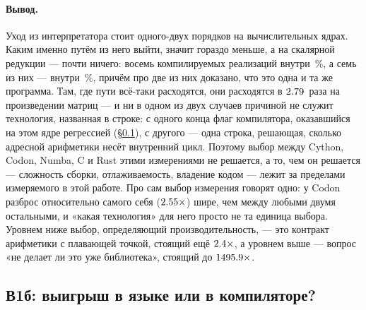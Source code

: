 \paragraph{Вывод.} Уход из интерпретатора стоит одного-двух порядков на вычислительных ядрах.
Каким именно путём из него выйти, значит гораздо меньше, а на скалярной редукции --- почти ничего:
восемь компилируемых реализаций внутри \,\%, а семь из них --- внутри \,\%, причём
про две из них доказано, что это одна и та же программа. Там, где пути всё-таки расходятся, они расходятся в $\meas{ratio:b1_compute-314:matmul/codon_jit|b1_compute-314:matmul/numba}{2.79}$~раза на произведении
матриц --- и ни в одном из двух случаев причиной не служит технология, названная в строке: с
одного конца флаг компилятора, оказавшийся на этом ядре регрессией (\S\ref{sec:rq1b}), с
другого --- одна строка, решающая, сколько адресной арифметики несёт внутренний цикл. Поэтому выбор
между Cython, Codon, Numba, C и Rust этими измерениями не решается, а то, чем он решается ---
сложность сборки, отлаживаемость, владение кодом --- лежит за пределами
измеряемого в этой работе. Про сам выбор измерения говорят одно: у Codon разброс относительно
самого себя ($\meas{ratio:b1_compute-314:matmul/codon_pyext|b1_compute-314:matmul/codon_pyext_ptr}{2.55}\times$) шире, чем между любыми двумя остальными, и «какая технология» для
него просто не та единица выбора.
Уровнем ниже выбор, определяющий производительность, --- это контракт арифметики с плавающей точкой, стоящий ещё
$\meas{ratio:b1_compute-314:arraysum/numba|b1_compute-314:arraysum/numba_fastmath}{2.4}\times$, а уровнем выше --- вопрос «не делает ли это уже библиотека», стоящий до $\meas{ratio:b1_compute-314:matmul/cpython_loop|b1_compute-314:matmul/numpy}{1495.9}\times$.

\subsection{В1б: выигрыш в языке или в компиляторе?}
\label{sec:rq1b}


